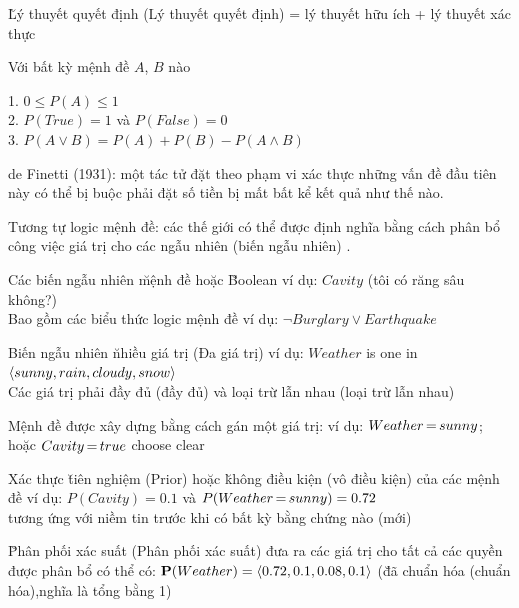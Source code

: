 \documentclass[fleqn]{article}
\begin{document}
\begin{huge}
\u{Lý thuyết quyết định (Lý thuyết quyết định)} = lý thuyết hữu ích + lý thuyết xác thực




Với bất kỳ mệnh đề $A$, $B$ nào

1. $0 \leq P(A) \leq 1$\\
2. $P(True) = 1$ và $P(False) = 0$\\
3. $P(A \lor B) = P(A) + P(B) - P(A\land B)$

\vspace*{0.2in}

\textwidth
{}

de Finetti (1931): một tác tử đặt theo phạm vi xác thực
những vấn đề đầu tiên này có thể bị buộc phải đặt số tiền bị mất bất kể kết quả như thế nào.





Tương tự logic mệnh đề: các thế giới có thể được định nghĩa bằng cách phân bổ công việc
giá trị cho các \u{ ngẫu nhiên (biến ngẫu nhiên) }.

Các biến ngẫu nhiên \u{mệnh đề} hoặc \u{Boolean}\al
  ví dụ: $Cavity$ (tôi có răng sâu không?)\\
Bao gồm các biểu thức logic mệnh đề\al
  ví dụ: $\lnot Burglary \lor Earthquake$

Biến ngẫu nhiên \u{nhiều giá trị (Đa giá trị)}\al
  ví dụ: $Weather$ is one in $\langle sunny,rain,cloudy,snow\rangle$\\
Các giá trị phải đầy đủ (đầy đủ) và loại trừ lẫn nhau (loại trừ lẫn nhau)

Mệnh đề được xây dựng bằng cách gán một giá trị:\al
ví dụ: $Weather {\,{=}\,} sunny$; hoặc $Cavity {\,{=}\,} true$ choose clear




Xác thực \u{tiên nghiệm (Prior)} hoặc \u{không điều kiện (vô điều kiện)} của các mệnh đề\al
  ví dụ: $P(Cavity) = 0.1$ và $P(Weather {\,{=}\,} sunny) = 0.72$\\
tương ứng với niềm tin trước khi có bất kỳ bằng chứng nào (mới)

\u{Phân phối xác suất (Phân phối xác suất)} đưa ra các giá trị cho tất cả các quyền được phân bổ có thể có:\al
  $\mbox{{\bf P}}(Weather) = \langle0.72,0.1,0.08,0.1\rangle$ (\u{đã chuẩn hóa (chuẩn hóa)},nghĩa là tổng bằng 1)


\end{huge}
\end{document}
